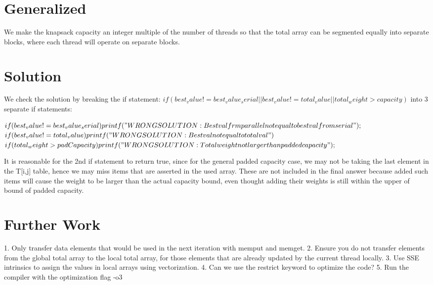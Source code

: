 \documentclass[11pt]{amsart}
\begin{document}
\section{Generalized}
We make the knapsack capacity an integer multiple of the number of threads so that the total array can be segmented equally into separate blocks, where each thread will operate on separate blocks.

\section{Solution}
We check the solution by breaking the if statement: 
$if( best_value != best_value_serial || best_value != total_value || total_weight > capacity )$
into 3 separate if statements:

$ if( best_value != best_value_serial ) printf( "WRONG SOLUTION: Best val frm parallel not equal to best val from serial" ); $
$ if( best_value != total_value ) printf("WRONG SOLUTION: Best val not equal to total val")$
$ if( total_weight > padCapacity ) printf( "WRONG SOLUTION: Total weight not larger than padded capacity" );$ 

It is reasonable for the 2nd if statement to return true, since for the general padded capacity case, we may not be taking the last element in the T[i,j] table, hence we may miss items that are asserted in the used array. These are not included in the final answer because added such items will cause the weight to be larger than the actual capacity bound, even thought adding their weights is still within the upper of bound of padded capacity.

\section{Further Work}
1. Only transfer data elements that would be used in the next iteration with memput and memget.
2. Ensure you do not transfer elements from the global total array to the local total array, for those elements that are already updated by the current thread locally.
3. Use SSE intrinsics to assign the values in local arrays using vectorization.
4. Can we use the restrict keyword to optimize the code? 
5. Run the compiler with the optimization flag -o3
\end{document}
